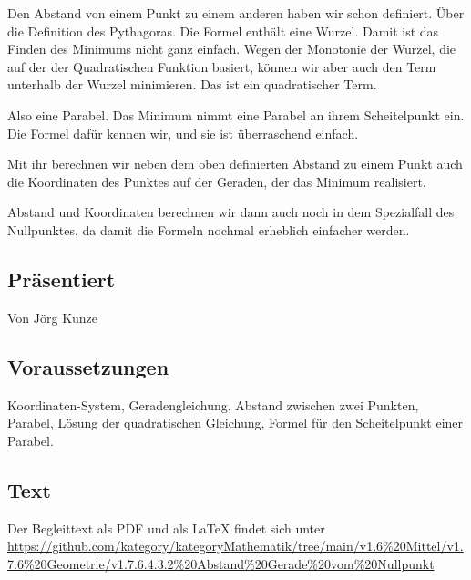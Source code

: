 \documentclass[a4paper]{amsart}
\theoremstyle{definition}
\begin{document}
Den Abstand von einem Punkt zu einem anderen haben wir schon definiert. Über die Definition des Pythagoras. Die Formel enthält eine Wurzel. Damit ist das Finden des Minimums nicht ganz einfach. Wegen der Monotonie der Wurzel, die auf der der Quadratischen Funktion basiert, können wir aber auch den Term unterhalb der Wurzel minimieren. Das ist ein quadratischer Term.

Also eine Parabel. Das Minimum nimmt eine Parabel an ihrem Scheitelpunkt ein. Die Formel dafür kennen wir, und sie ist überraschend einfach.

Mit ihr berechnen wir neben dem oben definierten Abstand zu einem Punkt auch die Koordinaten des Punktes auf der Geraden, der das Minimum realisiert. 

Abstand und Koordinaten berechnen wir dann auch noch in dem Spezialfall des Nullpunktes, da damit die Formeln nochmal erheblich einfacher werden.

\subsection*{Präsentiert}
Von Jörg Kunze

\subsection*{Voraussetzungen}
Koordinaten-System, Geradengleichung, Abstand zwischen zwei Punkten, Parabel, Lösung der quadratischen Gleichung, Formel für den Scheitelpunkt einer Parabel.

\subsection*{Text}
Der Begleittext als PDF und als LaTeX findet sich unter
{\tiny
   \url{https://github.com/kategory/kategoryMathematik/tree/main/v1.6%20Mittel/v1.7.6%20Geometrie/v1.7.6.4.3.2%20Abstand%20Gerade%20vom%20Nullpunkt}
}
\end{document}
